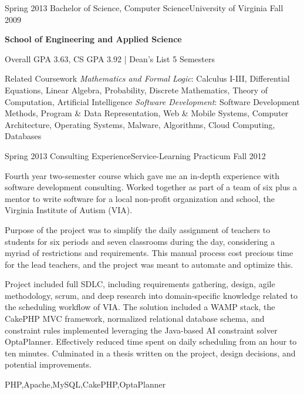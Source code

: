 \begin{scholarship}
  \experience
    {Spring 2013}   {Bachelor of Science, Computer Science}{University of Virginia}
    {Fall 2009}
                    {
                        \textbf{School of Engineering and Applied Science}

                        Overall GPA 3.63, CS GPA 3.92 | Dean's List 5 Semesters 

                        \ifcv
                        \textcolor{accentcolor}{Related Coursework}
                        \textit{Mathematics and Formal Logic}: Calculus I-III, Differential Equations, Linear Algebra, Probability, Discrete Mathematics, Theory of Computation, Artificial Intelligence
                        \textit{Software Development}: Software Development Methods, Program \& Data Representation, Web \& Mobile Systems, Computer Architecture, Operating Systems, Malware, Algorithms, Cloud Computing, Databases
                        \fi
                    }
                    {}
\end{scholarship}

\ifcv
\begin{scholarship}
  \experience
    {Spring 2013}  {Consulting Experience}{Service-Learning Practicum}
    {Fall 2012}    {
                        Fourth year two-semester course which gave me an in-depth experience with software development consulting. Worked together as part of a team of six plus a mentor to write software for a local non-profit organization and school, the Virginia Institute of Autism (VIA).

                        \vspace{0.5em}

                        Purpose of the project was to simplify the daily assignment of teachers to students for six periods and seven classrooms during the day, considering a myriad of restrictions and requirements. This manual process cost precious time for the lead teachers, and the project was meant to automate and optimize this.

                        \vspace{0.5em}

                        Project included full SDLC, including requirements gathering, design, agile methodology, scrum, and deep research into domain-specific knowledge related to the scheduling workflow of VIA. The solution included a WAMP stack, the CakePHP MVC framework, normalized relational database schema, and constraint rules implemented leveraging the Java-based AI constraint solver OptaPlanner. Effectively reduced time spent on daily scheduling from an hour to ten minutes. Culminated in a thesis written on the project, design decisions, and potential improvements.
                    }
                    {PHP,Apache,MySQL,CakePHP,OptaPlanner}
\end{scholarship}
\fi
